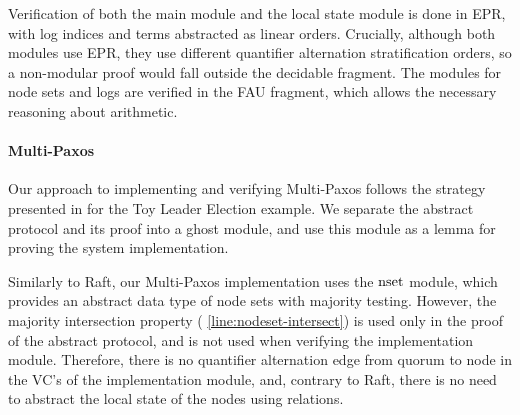 Verification of both the main module and the local state module is done in EPR,
with log indices and terms abstracted as linear orders. Crucially, although
both modules use EPR, they use different quantifier alternation stratification
orders, so a non-modular proof would fall outside the decidable fragment. The
modules for node sets and logs are verified in the FAU fragment, which allows
the necessary reasoning about arithmetic.




\paragraph{Multi-Paxos}

Our approach to implementing and verifying Multi-Paxos follows the
strategy presented in  for the Toy Leader Election
example. We separate the abstract protocol and its proof into a ghost
module, and use this module as a lemma for proving the system
implementation.

Similarly to Raft, our Multi-Paxos implementation uses the ${\text{nset}}$
module, which provides an abstract data type of node sets with majority
testing. However, the majority intersection property
( \cref{line:nodeset-intersect}) is used only in the
proof of the abstract protocol, and is not used when verifying the
implementation module. Therefore, there is no quantifier alternation
edge from quorum to node in the VC's of the implementation module,
and, contrary to Raft, there is no need to abstract the local state of
the nodes using relations.

